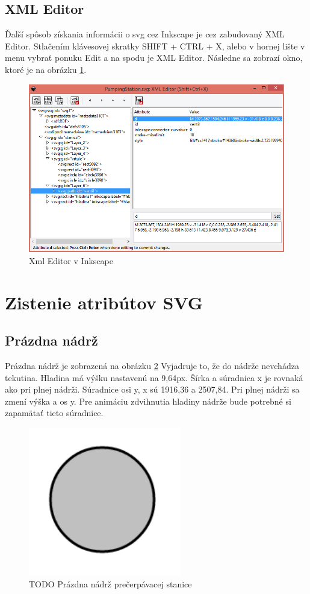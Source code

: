 \subsection{XML Editor}
Ďalší spôsob získania informácii o svg cez Inkscape je cez zabudovaný XML Editor.
Stlačením klávesovej skratky SHIFT + CTRL + X, alebo v hornej lište v menu vybrať ponuku Edit a na spodu je XML Editor. Následne sa zobrazí okno, ktoré je na obrázku \ref{xmlEditor}.
\begin{figure}[H]
	\begin{center}
		\includegraphics[width=0.7\linewidth]  {obrazky/XmlEditor2.png}
		\caption{Xml Editor v Inkscape}
		\label{xmlEditor}
	\end{center}
\end{figure}




\section{Zistenie atribútov SVG}

\subsection{Prázdna nádrž}
Prázdna nádrž je zobrazená na obrázku \ref{picture6}
Vyjadruje to, že do nádrže nevchádza tekutina. Hladina má výšku nastavenú na 9,64px. Šírka a súradnica x je rovnaká ako pri plnej nádrži. Súradnice osi y, x sú 1916,36 a 2507,84. Pri plnej nádrži sa zmení výška a os y. Pre animáciu zdvihnutia hladiny nádrže bude potrebné si zapamätať tieto súradnice. 
\begin{figure}[H]
	\begin{center}
		\includegraphics [height=6.5cm]  {obrazky/jednoduchyKruh.png}
		\caption{TODO Prázdna nádrž prečerpávacej stanice}
		\label{picture6}
	\end{center}
\end{figure}


